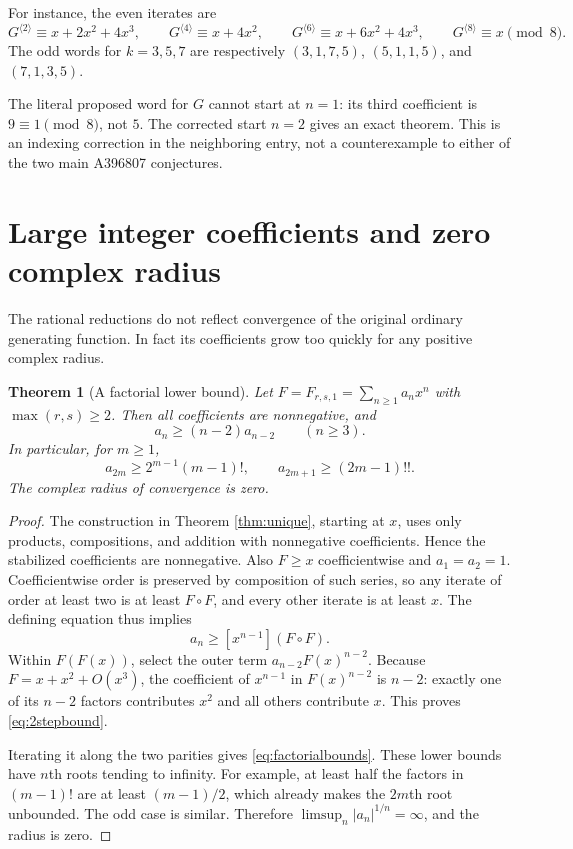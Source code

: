 \documentclass[11pt,letterpaper]{article}
\newtheorem{theorem}{Theorem}[section]
\theoremstyle{definition}
\theoremstyle{remark}
\newcommand{\iter}[2]{#1^{\langle #2\rangle}}
\newcommand{\coeff}[1]{[x^{#1}]}
\begin{document}
For instance, the even iterates are
\[
 \iter{G}{2}\equiv x+2x^2+4x^3,\qquad
 \iter{G}{4}\equiv x+4x^2,\qquad
 \iter{G}{6}\equiv x+6x^2+4x^3,\qquad
 \iter{G}{8}\equiv x\pmod8.
\]
The odd words for $k=3,5,7$ are respectively
$(3,1,7,5)$, $(5,1,1,5)$, and $(7,1,3,5)$.

The literal proposed word for $G$ cannot start at $n=1$:
its third coefficient is $9\equiv1\pmod8$, not $5$.
The corrected start $n=2$ gives an exact theorem.  This is an indexing
correction in the neighboring entry, not a counterexample to either
of the two main A396807 conjectures.

\section{Large integer coefficients and zero complex radius}\label{sec:growth}

The rational reductions do not reflect convergence of the original
ordinary generating function.  In fact its coefficients grow too
quickly for any positive complex radius.

\begin{theorem}[A factorial lower bound]\label{thm:growth}
Let $F=F_{r,s,1}=\sum_{n\geq1}a_nx^n$ with $\max(r,s)\geq2$.
Then all coefficients are nonnegative, and
\begin{equation}\label{eq:2stepbound}
 a_n\geq(n-2)a_{n-2}\qquad(n\geq3).
\end{equation}
In particular, for $m\geq1$,
\begin{equation}\label{eq:factorialbounds}
 a_{2m}\geq2^{m-1}(m-1)!,\qquad
 a_{2m+1}\geq(2m-1)!!.
\end{equation}
The complex radius of convergence is zero.
\end{theorem}
\begin{proof}
The construction in Theorem \ref{thm:unique}, starting at $x$, uses only
products, compositions, and addition with nonnegative coefficients.
Hence the stabilized coefficients are nonnegative.  Also $F\geq x$
coefficientwise and $a_1=a_2=1$.  Coefficientwise order is preserved by
composition of such series, so any iterate of order at least two is
at least $F\circ F$, and every other iterate is at least $x$.
The defining equation thus implies
\[
 a_n\geq\coeff{n-1}(F\circ F).
\]
Within $F(F(x))$, select the outer term $a_{n-2}F(x)^{n-2}$.
Because $F=x+x^2+O(x^3)$, the coefficient of $x^{n-1}$ in
$F(x)^{n-2}$ is $n-2$: exactly one of its $n-2$ factors contributes
$x^2$ and all others contribute $x$.  This proves
\eqref{eq:2stepbound}.

Iterating it along the two parities gives \eqref{eq:factorialbounds}.
These lower bounds have $n$th roots tending to infinity.
For example, at least half the factors in $(m-1)!$ are at least
$(m-1)/2$, which already makes the $2m$th root unbounded.
The odd case is similar.  Therefore
$\limsup_n |a_n|^{1/n}=\infty$, and the radius is zero.
\end{proof}
\end{document}

